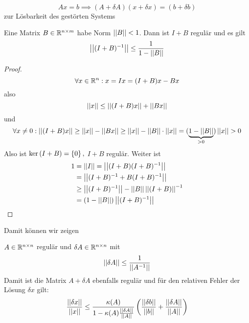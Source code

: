 \documentclass[../Skript.tex]{subfiles}
\begin{document}
\[
    Ax =  b \implies (A+\delta A) (x+\delta x) = (b+\delta b) \]
zur Lösbarkeit des gestörten Systems
\begin{lemma}
    Eine Matrix $B\in\Rnm{}{}$ habe Norm $\dabs{B} < 1$. Dann ist 
    $I+B$ regulär und es gilt \[
        \dabs{(I+B)^{-1}} \leq \frac{1}{1-\dabs{B}}\] 
\end{lemma}
\begin{proof}
    \[
        \forall x \in \R^n: x=I x = (I + B) x - Bx\]
    also \[
        \dabs{x} \leq \dabs{(I + B) x} + \dabs{Bx}\]
    und \[
        \forall x \neq 0: \dabs{(I+B) x} \geq \dabs{x} - \dabs{Bx} \geq \dabs{x} - \dabs{B}\cdot \dabs{x} = (\underbrace{1-\dabs{B}}_{>0})\dabs{x} > 0\]
    Also ist $\Kern{I + B} = \set{0},$ $I+B$ regulär. Weiter ist
    \begin{align*}1&=\dabs{I} = \dabs{(I+B)(I+B)^{-1}} \\&= \dabs{(I+B)^{-1} + B(I+B)^{-1}}\\
         &\geq \dabs{(I+B)^{-1}} - \dabs{B}\dabs{(I+B)}^{-1} \\&= (1-\dabs{B})\dabs{(I+B)^{-1}}
    \end{align*}
\end{proof}

Damit können wir zeigen
\begin{theorem}[Störungssatz]
    \(A\in\R^{n\times n}\) regulär und \(\delta A \in\R^{n\times n}\) mit \[\abs{\abs{\delta A }}\leq \frac{1}{\abs{\abs{A^{-1}}}}\]   
    Damit ist die Matrix \(A+\delta A\) ebenfalls regulär und für den relativen Fehler der Lösung \(\delta x\) gilt:
    \[
    \frac{\abs{\abs{\delta x}}}{\abs{\abs{x}}} \leq \frac{\kappa (A)}{1-\kappa (A)\frac{\abs{\abs{\delta A}}}{\abs{\abs{A}}}} 
    \left(\frac{\dabs{\delta b}}{\dabs{b}}+\frac{\dabs{\delta A}}{\dabs{A}}\right)
    \]
\end{theorem}
\end{document}
